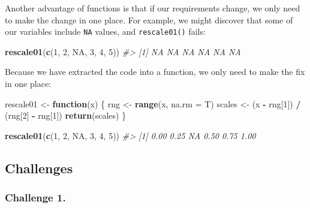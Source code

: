 \documentclass[
]{book}
\newenvironment{Shaded}{\begin{snugshade}}{\end{snugshade}}
\newcommand{\CommentTok}[1]{\textcolor[rgb]{0.56,0.35,0.01}{\textit{#1}}}
\newcommand{\ControlFlowTok}[1]{\textcolor[rgb]{0.13,0.29,0.53}{\textbf{#1}}}
\newcommand{\DataTypeTok}[1]{\textcolor[rgb]{0.13,0.29,0.53}{#1}}
\newcommand{\DecValTok}[1]{\textcolor[rgb]{0.00,0.00,0.81}{#1}}
\newcommand{\KeywordTok}[1]{\textcolor[rgb]{0.13,0.29,0.53}{\textbf{#1}}}
\newcommand{\NormalTok}[1]{#1}
\newcommand{\OperatorTok}[1]{\textcolor[rgb]{0.81,0.36,0.00}{\textbf{#1}}}
\newcommand{\OtherTok}[1]{\textcolor[rgb]{0.56,0.35,0.01}{#1}}
\newcommand{\StringTok}[1]{\textcolor[rgb]{0.31,0.60,0.02}{#1}}
\begin{document}
Another advantage of functions is that if our requirements change, we only need to make the change in one place. For example, we might discover that some of our variables include \texttt{NA} values, and \texttt{rescale01()} fails:

\begin{Shaded}
\begin{Highlighting}[]
\KeywordTok{rescale01}\NormalTok{(}\KeywordTok{c}\NormalTok{(}\DecValTok{1}\NormalTok{, }\DecValTok{2}\NormalTok{, }\OtherTok{NA}\NormalTok{, }\DecValTok{3}\NormalTok{, }\DecValTok{4}\NormalTok{, }\DecValTok{5}\NormalTok{))}
\CommentTok{#> [1] NA NA NA NA NA NA}
\end{Highlighting}
\end{Shaded}

Because we have extracted the code into a function, we only need to make the fix in one place:

\begin{Shaded}
\begin{Highlighting}[]
\NormalTok{rescale01 <-}\StringTok{ }\ControlFlowTok{function}\NormalTok{(x) \{}
\NormalTok{  rng <-}\StringTok{ }\KeywordTok{range}\NormalTok{(x, }\DataTypeTok{na.rm =}\NormalTok{ T)}
\NormalTok{  scales <-}\StringTok{ }\NormalTok{(x }\OperatorTok{-}\StringTok{ }\NormalTok{rng[}\DecValTok{1}\NormalTok{]) }\OperatorTok{/}\StringTok{ }\NormalTok{(rng[}\DecValTok{2}\NormalTok{] }\OperatorTok{-}\StringTok{ }\NormalTok{rng[}\DecValTok{1}\NormalTok{])}
  \KeywordTok{return}\NormalTok{(scales)}
\NormalTok{\}}

\KeywordTok{rescale01}\NormalTok{(}\KeywordTok{c}\NormalTok{(}\DecValTok{1}\NormalTok{, }\DecValTok{2}\NormalTok{, }\OtherTok{NA}\NormalTok{, }\DecValTok{3}\NormalTok{, }\DecValTok{4}\NormalTok{, }\DecValTok{5}\NormalTok{))}
\CommentTok{#> [1] 0.00 0.25   NA 0.50 0.75 1.00}
\end{Highlighting}
\end{Shaded}

\hypertarget{challenges-16}{%
\subsection{Challenges}\label{challenges-16}}

\hypertarget{challenge-1.-13}{%
\subsubsection*{Challenge 1.}\label{challenge-1.-13}}
\end{document}
